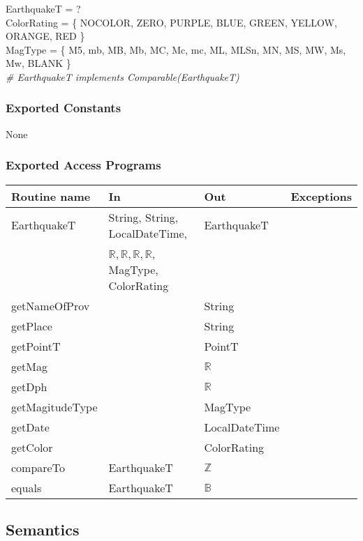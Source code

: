 \documentclass[12pt]{article}
\begin{document}
EarthquakeT = ?\\

\noindent ColorRating = \{ NOCOLOR, ZERO, PURPLE, BLUE, GREEN, YELLOW, ORANGE, RED \}\\

\noindent MagType = \{ M5, mb, MB, Mb, MC, Mc, mc, ML, MLSn, MN, MS, MW, Ms, Mw, BLANK \}\\

\noindent \textit{\# EarthquakeT implements Comparable(EarthquakeT)}

\subsubsection* {Exported Constants}

None

\subsubsection* {Exported Access Programs}

\begin{tabular}{| l | l | l | l |}
\hline
\textbf{Routine name} & \textbf{In} & \textbf{Out} & \textbf{Exceptions}\\
\hline
EarthquakeT & String, String, LocalDateTime, & EarthquakeT &\\
\hhline{|~|~|~|}
~ &$\mathbb{R}, \mathbb{R}, \mathbb{R}, \mathbb{R}$, MagType, ColorRating & ~ &\\
\hline
getNameOfProv & ~ & String & \\
\hline
getPlace & ~ & String & \\
\hline
getPointT & ~ & PointT & \\
\hline
getMag & ~ & $\mathbb{R}$ & \\
\hline
getDph & ~ & $\mathbb{R}$ & \\
\hline
getMagitudeType & ~ & MagType & \\
\hline
getDate & ~ & LocalDateTime & \\
\hline
getColor & ~ & ColorRating & \\
\hline
compareTo & EarthquakeT & $\mathbb{Z}$ & \\
\hline
equals & EarthquakeT & $\mathbb{B}$ & \\
\hline
\end{tabular}

\newpage

\subsection* {Semantics}
\end{document}
